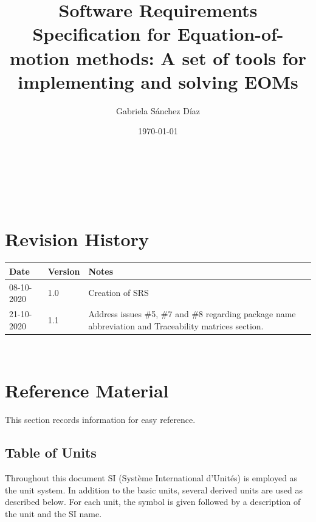 \documentclass[12pt]{article}
\begin{document}
\title{Software Requirements Specification for Equation-of-motion methods: A 
set of tools for implementing and solving EOMs} 
\author{Gabriela S\'anchez D\'iaz}
\date{\today}
	
\maketitle

~\newpage


\tableofcontents

~\newpage

\section*{Revision History}

\begin{tabularx}{\textwidth}{p{3cm}p{2cm}X}
\toprule {\bf Date} & {\bf Version} & {\bf Notes}\\
\midrule
08-10-2020 & 1.0 & Creation of SRS \\
21-10-2020 & 1.1 & Address issues \#5, \#7 and \#8 regarding package name 
abbreviation 
and Traceability matrices section.\\
\bottomrule
\end{tabularx}

~\newpage

\section{Reference Material}

This section records information for easy reference.

\subsection{Table of Units}

Throughout this document SI (Syst\`{e}me International d'Unit\'{e}s) is employed
as the unit system.  In addition to the basic units, several derived units are
used as described below.  For each unit, the symbol is given followed by a
description of the unit and the SI name.
~\newline
\end{document}
